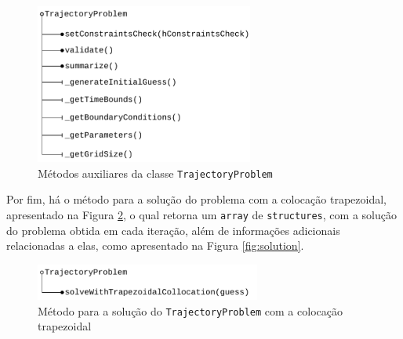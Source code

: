 \begin{figure}[H]
    \centering
    \includegraphics[width=0.64\textwidth]{Cap3/figuras/TrajectoryProblem-auxiliar.pdf}
    \caption{Métodos auxiliares da classe \texttt{TrajectoryProblem}}
    \label{fig:trajectoryproblem-auxiliar}
\end{figure}

Por fim, há o método para a solução do problema com a colocação trapezoidal, apresentado na Figura \ref{fig:trajectoryproblem-solve}, o qual retorna um \texttt{array} de \texttt{structures}, com a solução do problema obtida em cada iteração, além de informações adicionais relacionadas a elas, como apresentado na Figura \ref{fig:solution}.

\begin{figure}[H]
    \centering
    \includegraphics[width=0.66\textwidth]{Cap3/figuras/TrajectoryProblem-solve.pdf}
    \caption{Método para a solução do \texttt{TrajectoryProblem} com a colocação trapezoidal}
    \label{fig:trajectoryproblem-solve}
\end{figure}

